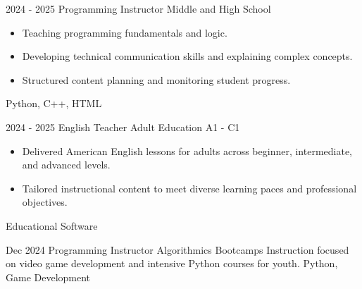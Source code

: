 
\begin{experiences}
  \experience
    {2024 - 2025}                             %
    {Programming Instructor}                  %
    {Middle}                  %
    { and High School}                  %
    { }                                       %
    {                                         %
      \begin{itemize}
        \item Teaching programming fundamentals and logic.
        \item Developing technical communication skills and explaining complex concepts.
        \item Structured content planning and monitoring student progress.
      \end{itemize}
    }
    {Python, C++, HTML}                       %

  \emptySeparator
  \experience
    {2024 - 2025}                                    %
    {English Teacher}               %
    { Adult Education}                  %
    { A1 - C1}               %
    { }                                    %
    {                                         %
      \begin{itemize}
        \item Delivered American English lessons for adults across beginner, intermediate, and advanced levels.
        \item Tailored instructional content to meet diverse learning paces and professional objectives.
      \end{itemize}
    }
    {Educational Software}                       %

  \emptySeparator

  \experience
    {Dec 2024}                                %
    {Programming Instructor}                  %
    {Algorithmics}                            %
    {Bootcamps}                               %
    {}                                        %
    {                                         %
      Instruction focused on video game development and intensive Python courses for youth.
    }
    {Python, Game Development}                %
\end{experiences}